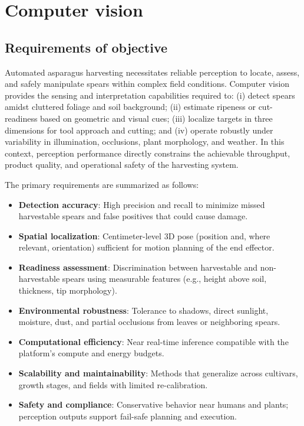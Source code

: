 \chapter{Computer vision}
\section{Requirements of objective}
Automated asparagus harvesting necessitates reliable perception to locate, assess, and safely manipulate spears within complex field conditions. Computer vision provides the sensing and interpretation capabilities required to: (i) detect spears amidst cluttered foliage and soil background; (ii) estimate ripeness or cut-readiness based on geometric and visual cues; (iii) localize targets in three dimensions for tool approach and cutting; and (iv) operate robustly under variability in illumination, occlusions, plant morphology, and weather. In this context, perception performance directly constrains the achievable throughput, product quality, and operational safety of the harvesting system.

The primary requirements are summarized as follows:
\begin{itemize}
  \item \textbf{Detection accuracy}: High precision and recall to minimize missed harvestable spears and false positives that could cause damage.
  \item \textbf{Spatial localization}: Centimeter-level 3D pose (position and, where relevant, orientation) sufficient for motion planning of the end effector.
  \item \textbf{Readiness assessment}: Discrimination between harvestable and non-harvestable spears using measurable features (e.g., height above soil, thickness, tip morphology).
  \item \textbf{Environmental robustness}: Tolerance to shadows, direct sunlight, moisture, dust, and partial occlusions from leaves or neighboring spears.
  \item \textbf{Computational efficiency}: Near real-time inference compatible with the platform's compute and energy budgets.
  \item \textbf{Scalability and maintainability}: Methods that generalize across cultivars, growth stages, and fields with limited re-calibration.
  \item \textbf{Safety and compliance}: Conservative behavior near humans and plants; perception outputs support fail-safe planning and execution.
\end{itemize}

